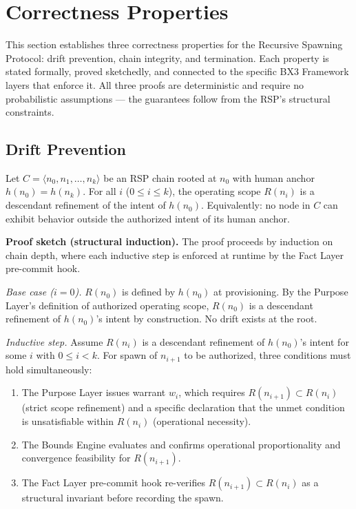 \section{Correctness Properties}
\label{sec:rs-correctness}

This section establishes three correctness properties for the Recursive Spawning Protocol: drift prevention, chain integrity, and termination. Each property is stated formally, proved sketchedly, and connected to the specific BX3 Framework layers that enforce it. All three proofs are deterministic and require no probabilistic assumptions --- the guarantees follow from the RSP's structural constraints.

\subsection{Drift Prevention}
\label{sec:rs-drift-prevention}

\begin{thrm}
\label{thrm:drift-prevention}
Let $C = \langle n_0, n_1, \ldots, n_k \rangle$ be an RSP chain rooted at $n_0$ with human anchor $h(n_0) = h(n_k)$. For all $i$ ($0 \leq i \leq k$), the operating scope $R(n_i)$ is a descendant refinement of the intent of $h(n_0)$. Equivalently: no node in $C$ can exhibit behavior outside the authorized intent of its human anchor.
\end{thrm}

\medskip\noindent\textbf{Proof sketch (structural induction).} The proof proceeds by induction on chain depth, where each inductive step is enforced at runtime by the Fact Layer pre-commit hook.

\medskip\noindent\textit{Base case ($i=0$).} $R(n_0)$ is defined by $h(n_0)$ at provisioning. By the Purpose Layer's definition of authorized operating scope, $R(n_0)$ is a descendant refinement of $h(n_0)$'s intent by construction. No drift exists at the root.

\medskip\noindent\textit{Inductive step.} Assume $R(n_i)$ is a descendant refinement of $h(n_0)$'s intent for some $i$ with $0 \leq i < k$. For spawn of $n_{i+1}$ to be authorized, three conditions must hold simultaneously:

\begin{enumerate}
  \item[(i)] The Purpose Layer issues warrant $w_i$, which requires $R(n_{i+1}) \subset R(n_i)$ (strict scope refinement) and a specific declaration that the unmet condition is unsatisfiable within $R(n_i)$ (operational necessity).
  \item[(ii)] The Bounds Engine evaluates and confirms operational proportionality and convergence feasibility for $R(n_{i+1})$.
  \item[(iii)] The Fact Layer pre-commit hook re-verifies $R(n_{i+1}) \subset R(n_i)$ as a structural invariant before recording the spawn.
\end{enumerate}

